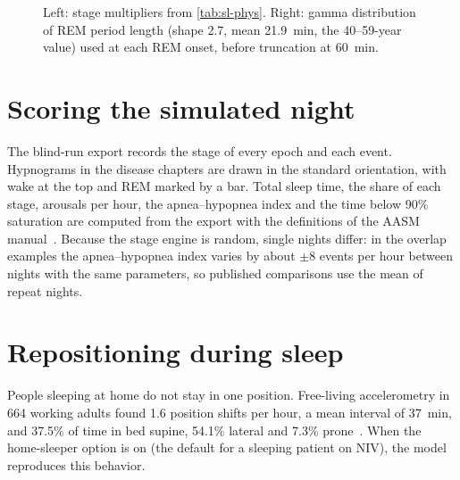 \begin{figure}[ht]
\centering
{}
\caption{Left: stage multipliers from \cref{tab:sl-phys}. Right: gamma distribution of REM period length (shape 2.7, mean \SI{21.9}{\minute}, the 40--59-year value) used at each REM onset, before truncation at \SI{60}{\minute}.}
\label{fig:sl-curves}
\end{figure}

\section{Scoring the simulated night}
\label{sec:sl-score}
The blind-run export records the stage of every epoch and each event. Hypnograms in the disease chapters are drawn in the standard orientation, with wake at the top and REM marked by a bar. Total sleep time, the share of each stage, arousals per hour, the apnea--hypopnea index and the time below 90\% saturation are computed from the export with the definitions of the AASM manual~\citep{berry2012}. Because the stage engine is random, single nights differ: in the overlap examples the apnea--hypopnea index varies by about $\pm 8$ events per hour between nights with the same parameters, so published comparisons use the mean of repeat nights.

\section{Repositioning during sleep}
\label{sec:sl-pos}
People sleeping at home do not stay in one position. Free-living accelerometry in 664 working adults found 1.6 position shifts per hour, a mean interval of \SI{37}{\minute}, and 37.5\% of time in bed supine, 54.1\% lateral and 7.3\% prone~\citep{skarpsno2017}. When the home-sleeper option is on (the default for a sleeping patient on NIV), the model reproduces this behavior.

